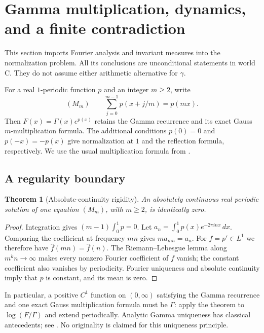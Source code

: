 \documentclass[11pt,a4paper]{article}
\newtheorem{theorem}{Theorem}[section]
\theoremstyle{definition}
\theoremstyle{remark}
\theoremstyle{plain}
\numberwithin{equation}{section}
\begin{document}
\section{Gamma multiplication, dynamics, and a finite contradiction}
\label{ra:sec:normalization}

This section imports Fourier analysis and invariant measures into the
normalization problem. All its conclusions are unconditional statements in
world C. They do not assume either arithmetic alternative for $\gamma$.

For a real $1$-periodic function $p$ and an integer $m\ge2$, write
\begin{equation}\label{ra:eq:Mm}
 (M_m)\qquad \sum_{j=0}^{m-1}p(x+j/m)=p(mx).
\end{equation}
Then $F(x)=\Gamma(x)e^{p(x)}$ retains the Gamma recurrence and its exact
Gauss $m$-multiplication formula. The additional conditions $p(0)=0$ and
$p(-x)=-p(x)$ give normalization at $1$ and the reflection formula,
respectively. We use the usual multiplication formula from \cite{DLMF}.

\subsection{A regularity boundary}

\begin{theorem}[Absolute-continuity rigidity]\label{ra:thm:AC}
An absolutely continuous real periodic solution of one equation $(M_m)$,
with $m\ge2$, is identically zero.
\end{theorem}
\begin{proof}
Integration gives $(m-1)\int_0^1p=0$. Let
$a_n=\int_0^1p(x)e^{-2\pi inx}\,dx$. Comparing the coefficient at
frequency $mn$ gives $m a_{mn}=a_n$. For $f=p'\in L^1$ we therefore
have $\widehat f(mn)=\widehat f(n)$. The Riemann--Lebesgue lemma along
$m^k n\to\infty$ makes every nonzero Fourier coefficient of $f$ vanish;
the constant coefficient also vanishes by periodicity. Fourier uniqueness
and absolute continuity imply that $p$ is constant, and its mean is zero.
\end{proof}

In particular, a positive $C^1$ function on $(0,\infty)$ satisfying the
Gamma recurrence and one exact Gauss multiplication formula must be
$\Gamma$: apply the theorem to $\log(F/\Gamma)$ and extend periodically.
Analytic Gamma uniqueness has classical antecedents; see
\cite[Section 2.11]{PerezMarco}. No originality is claimed for this
uniqueness principle.
\end{document}
